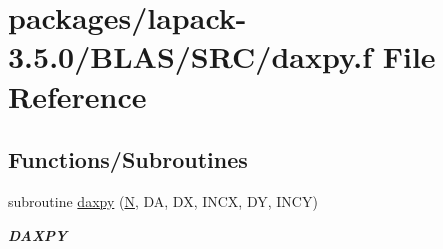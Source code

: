 \hypertarget{lapack-3_85_80_2BLAS_2SRC_2daxpy_8f}{}\section{packages/lapack-\/3.5.0/\+B\+L\+A\+S/\+S\+R\+C/daxpy.f File Reference}
\label{lapack-3_85_80_2BLAS_2SRC_2daxpy_8f}
\subsection*{Functions/\+Subroutines}
\begin{DoxyCompactItemize}
\item 
subroutine \hyperlink{group__double__blas__level1_ga8f99d6a644d3396aa32db472e0cfc91c}{daxpy} (\hyperlink{polmisc_8c_a0240ac851181b84ac374872dc5434ee4}{N}, D\+A, D\+X, I\+N\+C\+X, D\+Y, I\+N\+C\+Y)
\begin{DoxyCompactList}\small\item\em {\bfseries D\+A\+X\+P\+Y} \end{DoxyCompactList}\end{DoxyCompactItemize}
